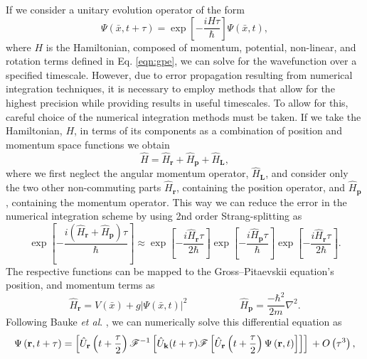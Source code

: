 If we consider a unitary evolution operator of the form
\begin{equation}\label{eqn:1}
\Psi(\bar{x},t+\tau) = \exp\left[ -\frac{iH\tau}{\hbar}\right]\Psi(\bar{x},t),
\end{equation}
where $H$ is the Hamiltonian, composed of momentum, potential, non-linear, and rotation terms defined in Eq. \eqref{eqn:gpe}, we can solve for
the wavefunction over a specified timescale. However, due to error propagation resulting from numerical integration techniques, it is necessary to
employ methods that allow for the highest precision while providing results in useful timescales. To allow for this, careful choice of the numerical integration methods must be taken.  If we take the Hamiltonian, $H$, in terms of its components as a combination of position and momentum space functions we obtain
\begin{equation}\label{eqn:2}
\hat{H} = \hat{H}_{\textbf{r}} + \hat{H}_{\textbf{p}} + \hat{H}_{\textbf{L}},
\end{equation}
where we first neglect the angular momentum operator, $\hat{H}_{\textbf{L}}$, and consider only the two other non-commuting parts $\hat{H}_{\textbf{r}}$, containing the position operator, and $\hat{H}_{\textbf{p}}$, containing the momentum operator. This way we can reduce
the error in the numerical integration scheme by using 2nd order Strang-splitting as
\begin{equation}\label{eqn:3}
\exp\left[ -\frac{ i\left(\hat{H}_{\textbf{r}} + \hat{H}_{\textbf{p}}\right)\tau}{\hbar} \right] \approx \exp\left[- \frac{i\hat{H}_{\textbf{r}}\tau}{2\hbar} \right]\exp\left[-\frac{i\hat{H}_{\textbf{p}}\tau}{\hbar}\right]\exp\left[ -\frac{i\hat{H}_{\textbf{r}}\tau}{2\hbar}\right].
\end{equation}
The respective functions can be mapped to the Gross--Pitaevskii equation's position, and momentum terms as
\begin{equation}
\hat{H}_{\textbf{r}} = V(\bar{x}) + g\vert\Psi(\bar{x},t)\vert^2\; \hspace{5em} \hat{H}_{\textbf{p}} = \frac{-\hbar^2}{2m}\nabla^2.
\end{equation}
Following Bauke \textit{et al}. \cite{Num:Bauke_cpc_2011}, we can numerically solve this differential equation as
\begin{equation}
\Psi\left(\textbf{r},t+\tau\right) = \left[\hat{U}_{\mathbf{r}}\left(t+\frac{\tau}{2}\right) \mathscr{F}^{-1} \left[ \hat{U}_{\mathbf{k}}(t+\tau) \mathscr{F} \left[ \hat{U}_{\mathbf{r}}\left(t+\frac{\tau}{2}\right) \Psi\left(\mathbf{r},t\right) \right] \right] \right]  \\ + O\left(\tau^3\right),
\end{equation}
